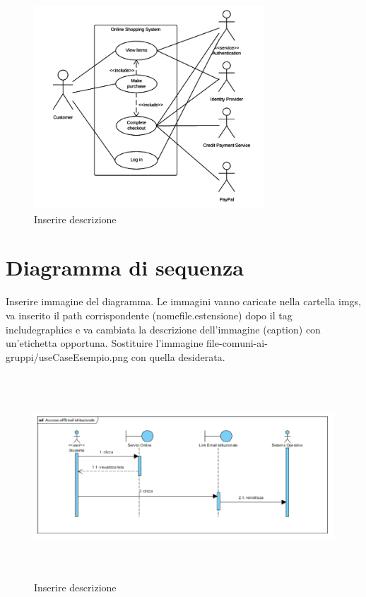 \begin{figure}
	\centering
	\includegraphics[height=3in]{imgs/file-comuni-ai-gruppi/useCaseEsempio.png}
	\caption{Inserire descrizione}
	\label{fig:prova}
\end{figure}

\section{Diagramma di sequenza}

Inserire immagine del diagramma. Le immagini vanno caricate nella cartella imgs, va inserito il path corrispondente (nomefile.estensione) dopo il tag includegraphics e va cambiata la descrizione dell'immagine (caption) con un'etichetta opportuna. Sostituire l'immagine file-comuni-ai-gruppi/useCaseEsempio.png con quella desiderata.

\begin{figure}
	\centering
	\includegraphics[height=3in,width=5in]{imgs/file-comuni-ai-gruppi/SequenceDgEsempio.png}
	\caption{Inserire descrizione}
	\label{fig:prova}
\end{figure}

